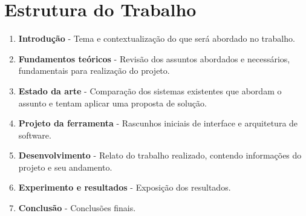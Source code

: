 \section{Estrutura do Trabalho}

\begin{enumerate}
\item \textbf{Introdução} - Tema e contextualização do que será abordado no trabalho.
\item \textbf{Fundamentos teóricos} - Revisão dos assuntos abordados e necessários, fundamentais para realização do projeto.
\item \textbf{Estado da arte} - Comparação dos sistemas existentes que abordam o assunto e tentam aplicar uma proposta de solução.
\item \textbf{Projeto da ferramenta} - Rascunhos iniciais de interface e arquitetura de software.
\item \textbf{Desenvolvimento} - Relato do trabalho realizado, contendo informações do projeto e seu andamento.
\item \textbf{Experimento e resultados} - Exposição dos resultados.
\item \textbf{Conclusão} - Conclusões finais.
\end{enumerate}
